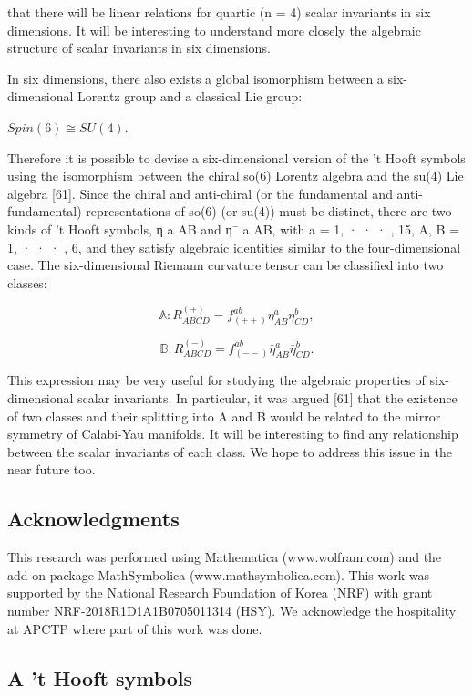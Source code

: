 \documentclass{article}
\begin{document}
that there will be linear relations for quartic (n = 4) scalar invariants in six dimensions. It will be interesting to understand more closely the algebraic structure of scalar invariants in six dimensions.

In six dimensions, there also exists a global isomorphism between a six-dimensional Lorentz group and a classical Lie group:

$Spin(6)\cong SU(4)$.

Therefore it is possible to devise a six-dimensional version of the 't Hooft symbols using the isomorphism between the chiral so(6) Lorentz algebra and the su(4) Lie algebra [61]. Since the chiral and anti-chiral (or the fundamental and anti-fundamental) representations of so(6) (or su(4)) must be distinct, there are two kinds of 't Hooft symbols, η a AB and η¯ a AB, with a = 1, · · · , 15, A, B = 1, · · · , 6, and they satisfy algebraic identities similar to the four-dimensional case. The six-dimensional Riemann curvature tensor can be classified into two classes:

$$\mathbb{A}:R^{(+)}_{ABCD}=f^{ab}_{(++)}\eta^{a}_{AB}\eta^{b}_{CD},\tag{5.17}$$

$$\mathbb{B}:R^{(-)}_{ABCD}=f^{ab}_{(--)}\bar{\eta}^{a}_{AB}\bar{\eta}^{b}_{CD}.\tag{5.18}$$

This expression may be very useful for studying the algebraic properties of six-dimensional scalar invariants. In particular, it was argued [61] that the existence of two classes and their splitting into A and B would be related to the mirror symmetry of Calabi-Yau manifolds. It will be interesting to find any relationship between the scalar invariants of each class. We hope to address this issue in the near future too.

\subsection{Acknowledgments}

This research was performed using Mathematica (www.wolfram.com) and the add-on package MathSymbolica (www.mathsymbolica.com). This work was supported by the National Research Foundation of Korea (NRF) with grant number NRF-2018R1D1A1B0705011314 (HSY). We acknowledge the hospitality at APCTP where part of this work was done.

\subsection{A 't Hooft symbols}
\end{document}
